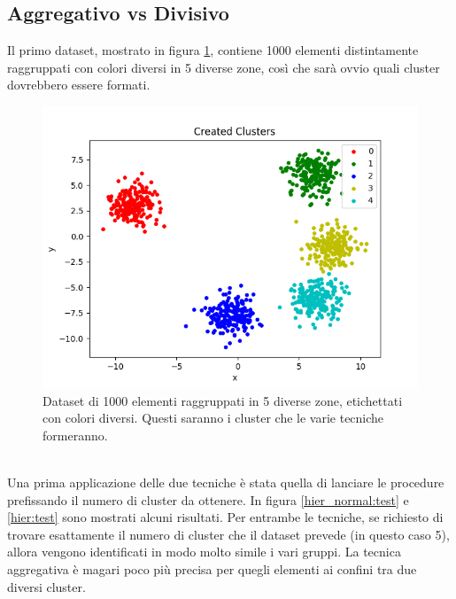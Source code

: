 \documentclass{llncs}
\begin{document}
	\subsection{Aggregativo vs Divisivo}
	Il primo dataset, mostrato in figura \ref{c:5_c}, contiene 1000 elementi distintamente raggruppati con colori diversi in 5 diverse zone, così che sarà ovvio quali cluster dovrebbero essere formati.
	\begin{figure}[h]
		\centering
		\includegraphics[scale=.35]{immagini/5_clusters.png}
		\caption{Dataset di 1000 elementi raggruppati in 5 diverse zone, etichettati con colori diversi. Questi saranno i cluster che le varie tecniche formeranno.}
		\label{c:5_c}
	\end{figure}\\
	Una prima applicazione delle due tecniche è stata quella di lanciare le procedure prefissando il numero di cluster da ottenere. 
	In figura \ref{hier_normal:test} e \ref{hier:test} sono mostrati alcuni risultati.
	Per entrambe le tecniche, se richiesto di trovare esattamente il numero di cluster che il dataset prevede (in questo caso 5),
	allora vengono identificati in modo molto simile i vari gruppi. La tecnica aggregativa è magari poco più precisa per quegli elementi ai confini tra due diversi cluster. 
\end{document}
